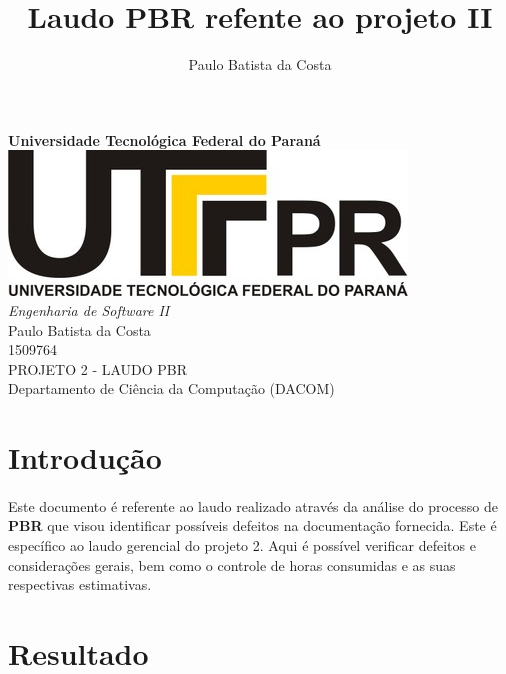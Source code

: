 \documentclass[12pt,a4paper]{article}
\author{Paulo Batista da Costa}
\title{Laudo PBR refente ao projeto II }
\begin{document}
	
        \begin{titlepage}
        \LARGE
        	\begin{center}
        	\vspace{5cm} 
        	\textbf{Universidade Tecnológica Federal do Paraná \\ \vspace{1.8cm}}
        	\includegraphics[scale=0.35]{logoutfpr.jpg} \\ \vspace{1.8cm}
        	\textit{Engenharia de Software II} \vspace{2cm} \\
        	Paulo Batista da Costa \\ 1509764 \vspace{2cm} \\ 
        	PROJETO 2 - LAUDO PBR \vspace{2cm} \\
        	Departamento de Ciência da Computação (DACOM) 
        	
        	\end{center}
        \end{titlepage}	
	
		\tableofcontents
		\newpage
		\section{Introdução} 
		\paragraph{} 
		Este documento é referente ao laudo realizado através da análise do processo de \textbf{PBR} que visou identificar possíveis defeitos na documentação fornecida. Este é específico ao laudo gerencial do projeto 2. Aqui é possível verificar defeitos e considerações gerais, bem como o controle de horas consumidas e as suas respectivas estimativas.
		
		\section{Resultado}
\end{document}
